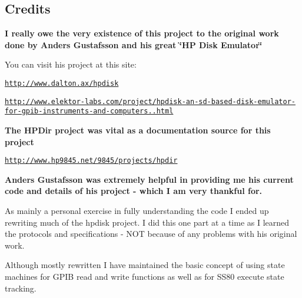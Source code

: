 \begin{DoxyItemize}
\begin{DoxyItemize}
\begin{DoxyItemize}
\begin{DoxyItemize}
\end{DoxyItemize}
\end{DoxyItemize}
\end{DoxyItemize}
\end{DoxyItemize}

\subsection*{Credits}

{\bfseries I really owe the very existence of this project to the original work done by Anders Gustafsson and his great \char`\"{}\+H\+P Disk Emulator\char`\"{} }
\begin{DoxyItemize}
\item You can visit his project at this site\+:
\begin{DoxyItemize}
\item \href{http://www.dalton.ax/hpdisk}{\tt http\+://www.\+dalton.\+ax/hpdisk}
\item \href{http://www.elektor-labs.com/project/hpdisk-an-sd-based-disk-emulator-for-gpib-instruments-and-computers.13693.html}{\tt http\+://www.\+elektor-\/labs.\+com/project/hpdisk-\/an-\/sd-\/based-\/disk-\/emulator-\/for-\/gpib-\/instruments-\/and-\/computers..\+html}
\end{DoxyItemize}
\end{DoxyItemize}

{\bfseries  The H\+P\+Dir project was vital as a documentation source for this project}
\begin{DoxyItemize}
\item \href{http://www.hp9845.net/9845/projects/hpdir}{\tt http\+://www.\+hp9845.\+net/9845/projects/hpdir}
\end{DoxyItemize}

{\bfseries Anders Gustafsson was extremely helpful in providing me his current code and details of his project -\/ which I am very thankful for.}

As mainly a personal exercise in fully understanding the code I ended up rewriting much of the hpdisk project. I did this one part at a time as I learned the protocols and specifications -\/ N\+OT because of any problems with his original work.

Although mostly rewritten I have maintained the basic concept of using state machines for G\+P\+IB read and write functions as well as for S\+S80 execute state tracking.

